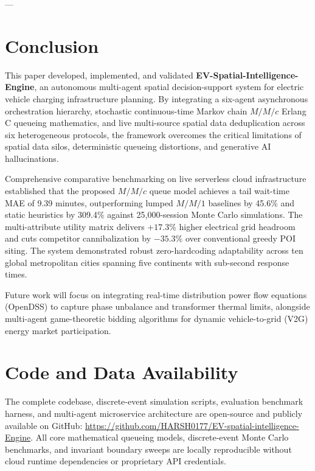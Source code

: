 \documentclass[preprint,12pt,authoryear]{elsarticle}
\begin{document}
---

\section{Conclusion}
\label{sec:conclusion}
This paper developed, implemented, and validated \textbf{EV-Spatial-Intelligence-Engine}, an autonomous multi-agent spatial decision-support system for electric vehicle charging infrastructure planning. By integrating a six-agent asynchronous orchestration hierarchy, stochastic continuous-time Markov chain $M/M/c$ Erlang C queueing mathematics, and live multi-source spatial data deduplication across six heterogeneous protocols, the framework overcomes the critical limitations of spatial data silos, deterministic queueing distortions, and generative AI hallucinations.

Comprehensive comparative benchmarking on live serverless cloud infrastructure established that the proposed $M/M/c$ queue model achieves a tail wait-time MAE of 9.39 minutes, outperforming lumped $M/M/1$ baselines by 45.6\% and static heuristics by 309.4\% against 25,000-session Monte Carlo simulations. The multi-attribute utility matrix delivers $+17.3\%$ higher electrical grid headroom and cuts competitor cannibalization by $-35.3\%$ over conventional greedy POI siting. The system demonstrated robust zero-hardcoding adaptability across ten global metropolitan cities spanning five continents with sub-second response times.

Future work will focus on integrating real-time distribution power flow equations (OpenDSS) to capture phase unbalance and transformer thermal limits, alongside multi-agent game-theoretic bidding algorithms for dynamic vehicle-to-grid (V2G) energy market participation.

\section*{Code and Data Availability}
The complete codebase, discrete-event simulation scripts, evaluation benchmark harness, and multi-agent microservice architecture are open-source and publicly available on GitHub: \url{https://github.com/HARSH0177/EV-spatial-intelligence-Engine}. All core mathematical queueing models, discrete-event Monte Carlo benchmarks, and invariant boundary sweeps are locally reproducible without cloud runtime dependencies or proprietary API credentials.
\end{document}
